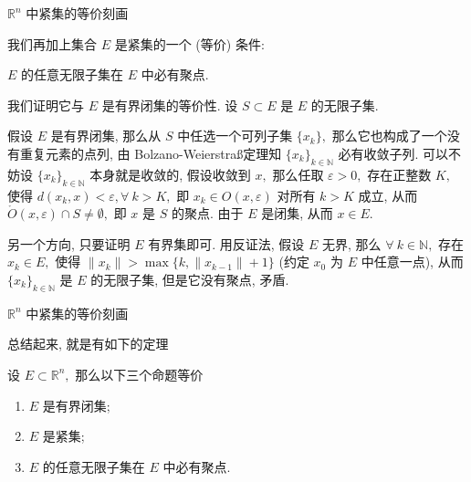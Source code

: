 \begin{frame}{$\mathbb{R}^n$ 中紧集的等价刻画}

我们再加上集合 $E$ 是紧集的一个 (等价) 条件:
\begin{center}
$E$ 的任意无限子集在 $E$ 中必有聚点.
\end{center}

\pause
\vspace{1em}

我们证明它与 $E$ 是有界闭集的等价性. 设 $S \subset E$ 是 $E$ 的无限子集.

\pause
\vspace{1em}

假设 $E$ 是有界闭集, 那么从 $S$ 中任选一个可列子集 $\{ x_k \},$ 那么它也构成了一个没有重复元素的点列,
由 Bolzano-Weierstra\ss 定理知 $\{ x_k \}_{k\in\mathbb{N}}$ 必有收敛子列. 可以不妨设 $\{ x_k \}_{k\in\mathbb{N}}$ 本身就是收敛的, 假设收敛到 $x,$ 那么任取 $\varepsilon > 0,$ 存在正整数 $K,$ 使得 $d(x_k, x) < \varepsilon, \forall~k > K,$ 即 $x_k \in O(x, \varepsilon)$ 对所有 $k > K$ 成立, 从而 $\mathring{O}(x, \varepsilon) \cap S \neq \emptyset,$ 即 $x$ 是 $S$ 的聚点. 由于 $E$ 是闭集, 从而 $x \in E.$

\pause
\vspace{1em}

另一个方向, 只要证明 $E$ 有界集即可. 用反证法, 假设 $E$ 无界, 那么 $\forall~k \in \mathbb{N},$ 存在 $x_k \in E,$ 使得 $\lVert x_k \rVert > \max\{k, \lVert x_{k-1} \rVert + 1\}$ (约定 $x_0$ 为 $E$ 中任意一点), 从而 $\{ x_k \}_{k\in\mathbb{N}}$ 是 $E$ 的无限子集, 但是它没有聚点, 矛盾.

\end{frame}


\begin{frame}{$\mathbb{R}^n$ 中紧集的等价刻画}

总结起来, 就是有如下的定理

\begin{thm}
设 $E \subset \mathbb{R}^n,$ 那么以下三个命题等价
\begin{enumerate}
\item $E$ 是有界闭集;
\item $E$ 是紧集;
\item $E$ 的任意无限子集在 $E$ 中必有聚点.
\end{enumerate}
\end{thm}

\end{frame}

